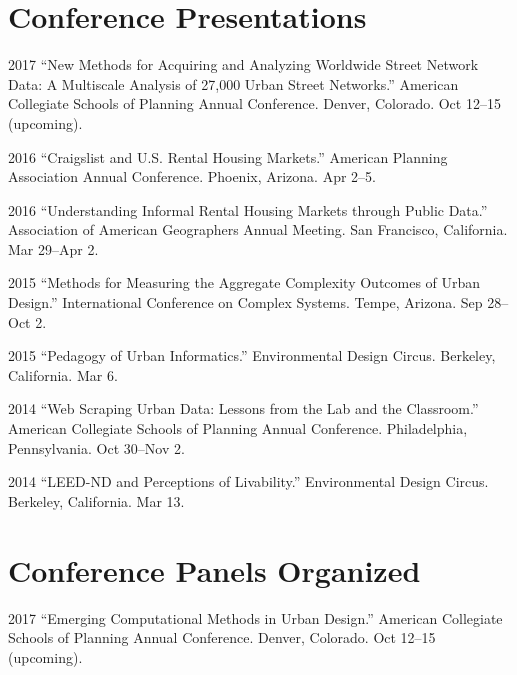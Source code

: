 \documentclass{academiccv}
\begin{document}
\section*{Conference Presentations}

\begin{tablist}

\item[2017] \tab \enquote{New Methods for Acquiring and Analyzing Worldwide Street Network Data: A Multiscale Analysis of 27,000 Urban Street Networks.} American Collegiate Schools of Planning Annual Conference. Denver, Colorado. Oct 12--15 (upcoming).

\item[2016] \tab \enquote{Craigslist and U.S. Rental Housing Markets.} American Planning Association Annual Conference. Phoenix, Arizona. Apr 2--5.

\item[2016] \tab \enquote{Understanding Informal Rental Housing Markets through Public Data.} Association of American Geographers Annual Meeting. San Francisco, California. Mar 29--Apr 2.

\item[2015] \tab \enquote{Methods for Measuring the Aggregate Complexity Outcomes of Urban Design.} International Conference on Complex Systems. Tempe, Arizona. Sep 28--Oct 2.

\item[2015] \tab \enquote{Pedagogy of Urban Informatics.} Environmental Design Circus. Berkeley, California. Mar 6.

\item[2014] \tab \enquote{Web Scraping Urban Data: Lessons from the Lab and the Classroom.} American Collegiate Schools of Planning Annual Conference. Philadelphia, Pennsylvania. Oct 30--Nov 2.

\item[2014] \tab \enquote{LEED-ND and Perceptions of Livability.} Environmental Design Circus. Berkeley, California. Mar 13.

\end{tablist}



\section*{Conference Panels Organized}

\begin{tablist}

\item[2017] \tab \enquote{Emerging Computational Methods in Urban Design.} American Collegiate Schools of Planning Annual Conference. Denver, Colorado. Oct 12--15 (upcoming).

\end{tablist}
\end{document}
